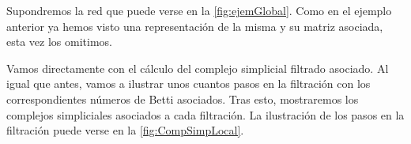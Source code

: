\documentclass[12pt, a4paper, twoside]{book}
\numberwithin{equation}{section}
\theoremstyle{definition}
\newenvironment{ejem}
  {\pushQED{\qed}\renewcommand{\qedsymbol}{$\blacktriangleleft$}\ejemplo}
  {\popQED\endejemplo}
\theoremstyle{remark}
\theoremstyle{plain}
\begin{document}
	\begin{ejem}
		Supondremos la red que puede verse en 
		la \autoref{fig:ejemGlobal}. Como en el ejemplo 
		anterior ya hemos visto una representación de la misma y su 
		matriz asociada, esta vez los omitimos.

		Vamos directamente con el cálculo del complejo simplicial 
		filtrado asociado. Al igual que antes, vamos a ilustrar unos 
		cuantos pasos en la filtración con los correspondientes 
		números de Betti asociados. Tras esto, mostraremos los 
		complejos simpliciales asociados a cada filtración. La 
		ilustración de los pasos en la filtración puede verse en 
		la \autoref{fig:CompSimpLocal}.

		\begin{figure}[!htbp]
\end{figure}
\end{ejem}
\end{document}
